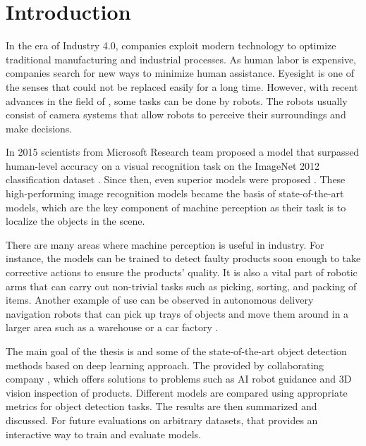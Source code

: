 \chapter{Introduction}

In the era of Industry 4.0, companies exploit modern technology to optimize
traditional manufacturing and industrial processes. As human labor is expensive,
companies search for new ways to minimize human assistance. Eyesight is one of
the senses that could not be replaced easily for a long time. However, with
recent advances in the field of , some tasks can be done by
robots. The robots usually consist of camera systems that allow robots to
perceive their surroundings and make decisions.

In 2015 scientists from Microsoft Research team proposed a 
model \cite{surp2015} that surpassed human-level accuracy on a visual
recognition task on the ImageNet 2012 classification dataset \cite{imagenet}.
Since then, even superior models were proposed \cite{resnet, efficientnet}.
These high-performing image recognition models became the basis of
state-of-the-art  models, which are the key component of
machine perception as their task is to localize the objects in the scene.

There are many areas where machine perception is useful in industry. For
instance, the models can be trained to detect faulty products soon enough to
take corrective actions to ensure the products' quality. It is also a vital part
of robotic arms that can carry out non-trivial tasks such as picking, sorting,
and packing of items. Another example of use can be observed in autonomous
delivery navigation robots that can pick up trays of objects and move them
around in a larger area such as a warehouse or a car factory \cite{bmw}.

The main goal of the thesis is  and  some of
the state-of-the-art object detection methods based on deep learning approach.
The  provided by
collaborating company , which offers solutions to problems
such as AI robot guidance and 3D vision inspection of products. Different models
are compared using appropriate metrics for object detection tasks. The results
are then summarized and discussed. For future evaluations on arbitrary datasets,
 that provides an interactive way to train
and evaluate models.

